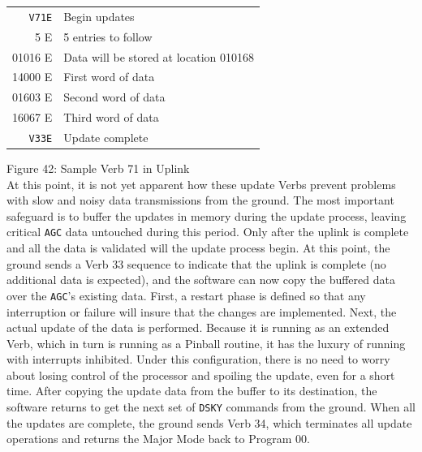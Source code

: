 \documentclass[refcap, oxford]{ahsan}
\begin{document}
\begin{center}
\begin{tabular}{rl}
\texttt{V71E} & Begin updates \\
5 E & 5 entries to follow \\
01016 E & Data will be stored at location 010168 \\
14000 E & First word of data \\
01603 E & Second word of data \\
16067 E & Third word of data \\
\texttt{V33E} & Update complete \\
\end{tabular}
\end{center}

Figure 42: Sample Verb 71 in Uplink\\

At this point, it is not yet apparent how these update Verbs prevent problems with slow and noisy data transmissions from the ground. The most important safeguard is to buffer the updates in memory during the update process, leaving critical \texttt{AGC} data untouched during this period. Only after the uplink is complete and all the data is validated will the update process begin. At this point, the ground sends a Verb 33 sequence to indicate that the uplink is complete (no additional data is expected), and the software can now copy the buffered data over the \texttt{AGC}'s existing data. First, a restart phase is defined so that any interruption or failure will insure that the changes are implemented. Next, the actual update of the data is performed. Because it is running as an extended Verb, which in turn is running as a Pinball routine, it has the luxury of running with interrupts inhibited. Under this configuration, there is no need to worry about losing control of the processor and spoiling the update, even for a short time. After copying the update data from the buffer to its destination, the software returns to get the next set of \texttt{DSKY} commands from the ground. When all the updates are complete, the ground sends Verb 34, which terminates all update operations and returns the Major Mode back to Program 00.

\end{document}

